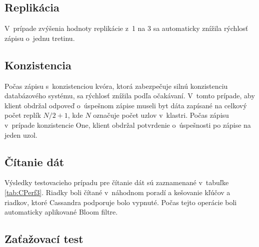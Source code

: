\documentclass[11pt,twoside,a4paper]{book}
\begin{document}
\subsection*{Replikácia}

V~prípade zvýšenia hodnoty replikácie z~1 na 3 sa automaticky znížila rýchlosť zápisu o~jednu tretinu.

\subsection*{Konzistencia}

Počas zápisu s~konzistenciou kvóra, ktorá zabezpečuje silnú konzistenciu databázového systému, sa rýchlosť znížila podľa očakávaní. V~tomto prípade, aby klient obdržal odpoveď o~úspešnom zápise museli byt dáta zapísané na celkový počet replík $N/2 + 1$, kde $N$ označuje počet uzlov v~klastri. Počas zápisu v~prípade konzistencie One, klient obdržal potvrdenie o~úspešnosti po zápise na jeden uzol.

\subsection*{Čítanie dát}

Výsledky testovacieho prípadu pre čítanie dát sú zaznamenané v~tabuľke \ref{tab:CPerf3}. Riadky boli čítané v~náhodnom poradí a kešovanie kľúčov a riadkov, ktoré Cassandra podporuje bolo vypnuté. Počas tejto operácie boli automaticky aplikované Bloom filtre.



\subsection*{Zaťažovací test}
\end{document}
